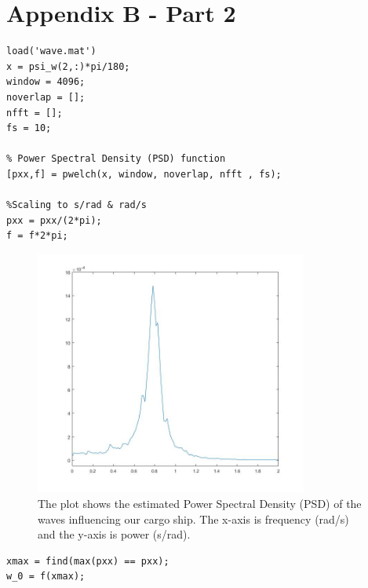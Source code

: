 \section{Appendix B - Part 2}

\begin{lstlisting}[frame=single, label={lst:2a_PSD}, caption={MATLAB code to find the estimate of the Power Spectral Density of $S_{\psi_w}(w)$},captionpos=b]
%Part 2a
load('wave.mat')
x = psi_w(2,:)*pi/180;
window = 4096;
noverlap = [];
nfft = [];  
fs = 10;

% Power Spectral Density (PSD) function
[pxx,f] = pwelch(x, window, noverlap, nfft , fs); 

%Scaling to s/rad & rad/s
pxx = pxx/(2*pi);
f = f*2*pi;

\end{lstlisting}

\begin{figure}[H]
    \centering
    \includegraphics[width=0.8\textwidth]{Plots/2a_PSD.jpg}
    \caption{The plot shows the estimated Power Spectral Density (PSD) of the waves influencing our cargo ship. The x-axis is frequency (rad/s) and the y-axis is power (s/rad).}
    \label{fig: 2a_PSD}
\end{figure}

\begin{lstlisting}[frame=single, label={lst:2c_omegazero}, caption={MATLAB code to find $\omega_0$ from the estimated $S_{\psi_w}(w)$ combined with the MATLAB code in Listing (\ref{lst:2a_PSD}).},captionpos=b]
xmax = find(max(pxx) == pxx);
w_0 = f(xmax);
\end{lstlisting}

